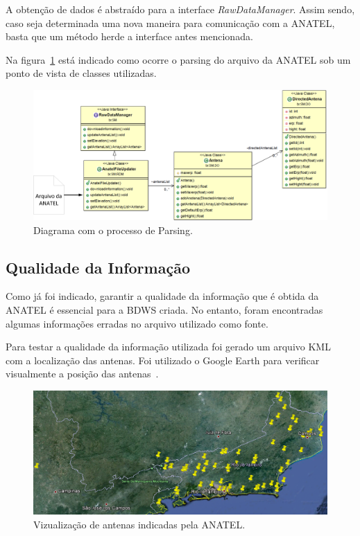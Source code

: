 A obtenção de dados é abstraído para a interface \textit{RawDataManager}. Assim sendo, caso seja determinada uma nova maneira para comunicação com a ANATEL, basta que um método herde a interface antes mencionada. 

Na figura~\ref{fig:parse} está indicado como ocorre o parsing do arquivo da ANATEL sob um ponto de vista de classes utilizadas.

\begin{figure}[htb]
\centering
\includegraphics[width=1\textwidth]{figs/rdmext}
\caption[Diagrama com o processo de Parsing.]
{Diagrama com o processo de Parsing.}
\label{fig:parse}
\end{figure}


\subsection{Qualidade da Informação}


Como já foi indicado, garantir a qualidade da informação que é obtida da ANATEL é essencial para a BDWS criada. No entanto, foram encontradas algumas informações erradas no arquivo utilizado como fonte.

Para testar a qualidade da informação utilizada foi gerado um arquivo KML~\cite{KML} com a localização das antenas. Foi utilizado o Google Earth para verificar visualmente a posição das antenas~\cite{gearth}.

\begin{figure}[htb]
\centering
\includegraphics[width=1.0\textwidth]{figs/antenamap}
\caption[Vizualização de antenas indicadas pela ANATEL.]
{Vizualização de antenas indicadas pela ANATEL.}
\label{fig:antenamap}
\end{figure} 

